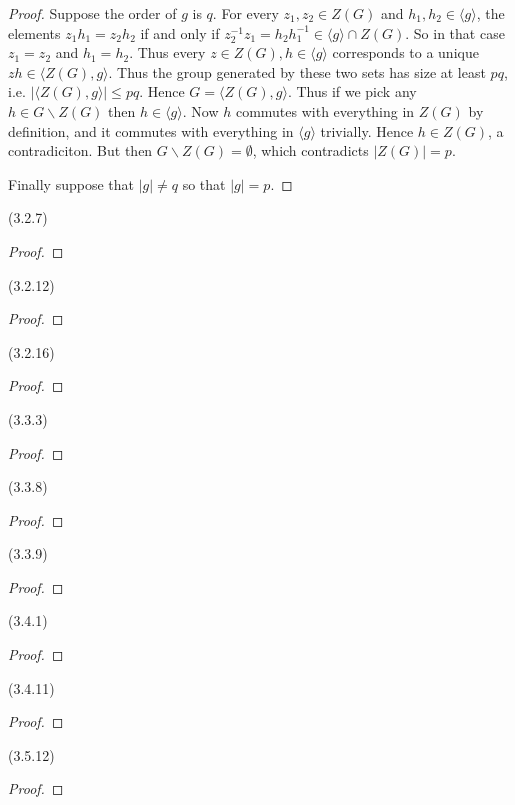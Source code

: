 \documentclass{exam}
\begin{document}
\begin{questions}
\begin{proof}
  Suppose the order of $g$ is $q$.  For every $z_1,z_2\in Z(G)$ and $h_1,h_2\in \langle g\rangle$, the elements $z_1h_1 = z_2h_2$ if and only if $z_2^{-1}z_1 = h_2h_1^{-1}\in \langle g\rangle \cap Z(G)$.  So in that case $z_1=z_2$ and $h_1=h_2$.  Thus every $z\in Z(G), h\in \langle g\rangle$ corresponds to a unique $zh\in \langle Z(G),g\rangle$.  Thus the group generated by these two sets has size at least $pq$, i.e. $|\langle Z(G),g\rangle|\leq pq$.  Hence $G = \langle Z(G),g\rangle$.  Thus if we pick any $h\in G\smallsetminus Z(G)$ then $h\in \langle g\rangle$.  Now $h$ commutes with everything in $Z(G)$ by definition, and it commutes with everything in $\langle g\rangle$ trivially.  Hence $h\in Z(G)$, a contradiciton.  But then $G\smallsetminus Z(G)= \emptyset$, which contradicts $|Z(G)|=p$.

  Finally suppose that $|g|\ne q$ so that $|g|=p$.
\end{proof}

\question(3.2.7)\\

\begin{proof}
\end{proof}

\question(3.2.12)\\

\begin{proof}
\end{proof}

\question(3.2.16)\\

\begin{proof}
\end{proof}

\question(3.3.3)\\

\begin{proof}
\end{proof}

\question(3.3.8)\\

\begin{proof}
\end{proof}

\question(3.3.9)\\

\begin{proof}
\end{proof}

\question(3.4.1)\\

\begin{proof}
\end{proof}

\question(3.4.11)\\

\begin{proof}
\end{proof}

\question(3.5.12)\\

\begin{proof}
\end{proof}


\end{questions}
\end{document}
